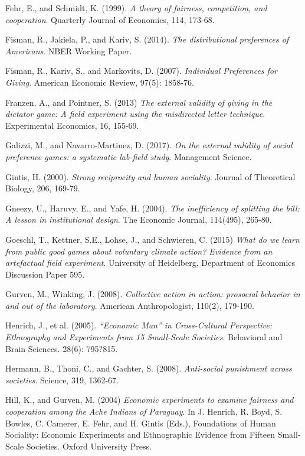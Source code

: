 \documentclass[12pt]{article}
\begin{document}
\begin{thebibliography}{9}
Fehr, E., and Schmidt, K. (1999).
\textit{A theory of fairness, competition, and cooperation}.
Quarterly Journal of Economics, 114, 173-68.

Fisman, R., Jakiela, P., and Kariv, S. (2014).
\textit{The distributional preferences of Americans}.
NBER Working Paper.

Fisman, R., Kariv, S., and Markovits, D. (2007).
\textit{Individual Preferences for Giving}.
American Economic Review, 97(5): 1858-76.

Franzen, A., and Pointner, S. (2013)
\textit{The external validity of giving in the dictator game: A field experiment using the misdirected letter technique}.
Experimental Economics, 16, 155-69.

Galizzi, M., and Navarro-Martinez, D. (2017).
\textit{On the external validity of social preference games: a systematic lab-field study}.
Management Science.

Gintis, H. (2000).
\textit{Strong reciprocity and human sociality}.
Journal of Theoretical Biology, 206, 169-79.

Gneezy, U., Haruvy, E., and Yafe, H. (2004).
\textit{The inefficiency of splitting the bill: A lesson in institutional design}.
The Economic Journal, 114(495), 265-80.

Goeschl, T., Kettner, S.E., Lohse, J., and Schwieren, C. (2015)
\textit{What do we learn from public good games about voluntary climate action? Evidence from an artefactual field experiment}.
University of Heidelberg, Department of Economics Discussion Paper 595.

Gurven, M., Winking, J. (2008).
\textit{Collective action in action: prosocial behavior in and out of the laboratory}.
American Anthropologist, 110(2), 179-190. 


Henrich, J., et al. (2005).
\textit{``Economic Man'' in Cross-Cultural Perspective: Ethnography and Experiments from 15 Small-Scale Societies}.
Behavioral and Brain Sciences. 28(6): 795?815.

Hermann, B., Thoni, C., and Gachter, S. (2008).
\textit{Anti-social punishment across societies}.
Science, 319, 1362-67.

Hill, K., and Gurven, M. (2004)
\textit{Economic experiments to examine fairness and cooperation among the Ache Indians of Paraguay}.
In J. Henrich, R. Boyd, S. Bowles, C. Camerer, E. Fehr, and H. Gintis (Eds.),
Foundations of Human Sociality: Economic Experiments and Ethnographic Evidence from Fifteen Small-Scale Societies. Oxford University Press.


\end{thebibliography}
\end{document}

